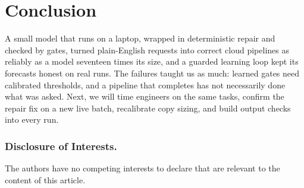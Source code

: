 \documentclass[runningheads]{llncs}
\begin{document}
\section{Conclusion}

A small model that runs on a laptop, wrapped in deterministic repair and checked by gates, turned plain-English
requests into correct cloud pipelines as reliably as a model seventeen times its size, and a guarded learning
loop kept its forecasts honest on real runs. The failures taught us as much: learned gates need calibrated
thresholds, and a pipeline that completes has not necessarily done what was asked. Next, we will time engineers
on the same tasks, confirm the repair fix on a new live batch, recalibrate copy sizing, and build output
checks into every run.

\subsubsection*{Disclosure of Interests.}
The authors have no competing interests to declare that are relevant to the content of this article.
\end{document}
